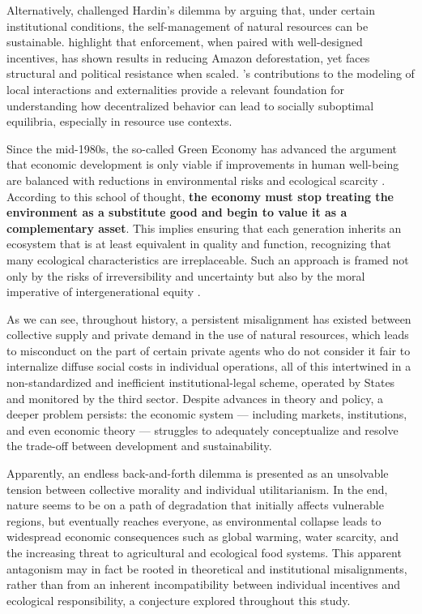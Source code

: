 Alternatively,  challenged Hardin’s dilemma by arguing that, under certain institutional conditions, the self-management of natural resources can be sustainable.  highlight that enforcement, when paired with well-designed incentives, has shown results in reducing Amazon deforestation, yet faces structural and political resistance when scaled. ’s contributions to the modeling of local interactions and externalities provide a relevant foundation for understanding how decentralized behavior can lead to socially suboptimal equilibria, especially in resource use contexts. 

Since the mid-1980s, the so-called Green Economy has advanced the argument that economic development is only viable if improvements in human well-being are balanced with reductions in environmental risks and ecological scarcity \cite{jacobs1991green}. According to this school of thought, \textbf{the economy must stop treating the environment as a substitute good and begin to value it as a complementary asset}. This implies ensuring that each generation inherits an ecosystem that is at least equivalent in quality and function, recognizing that many ecological characteristics are irreplaceable. Such an approach is framed not only by the risks of irreversibility and uncertainty but also by the moral imperative of intergenerational equity \cite{pearce1989blueprint}.

As we can see, throughout history, a persistent misalignment has existed between collective supply and private demand in the use of natural resources, which leads to misconduct on the part of certain private agents who do not consider it fair to internalize diffuse social costs in individual operations, all of this intertwined in a non-standardized and inefficient institutional-legal scheme, operated by States and monitored by the third sector. Despite advances in theory and policy, a deeper problem persists: the economic system — including markets, institutions, and even economic theory — struggles to adequately conceptualize and resolve the trade-off between development and sustainability. 

Apparently, an endless back-and-forth dilemma is presented as an unsolvable tension between collective morality and individual utilitarianism. In the end, nature seems to be on a path of degradation that initially affects vulnerable regions, but eventually reaches everyone, as environmental collapse leads to widespread economic consequences such as global warming, water scarcity, and the increasing threat to agricultural and ecological food systems. This apparent antagonism may in fact be rooted in theoretical and institutional misalignments, rather than from an inherent incompatibility between individual incentives and ecological responsibility, a conjecture explored throughout this study.

